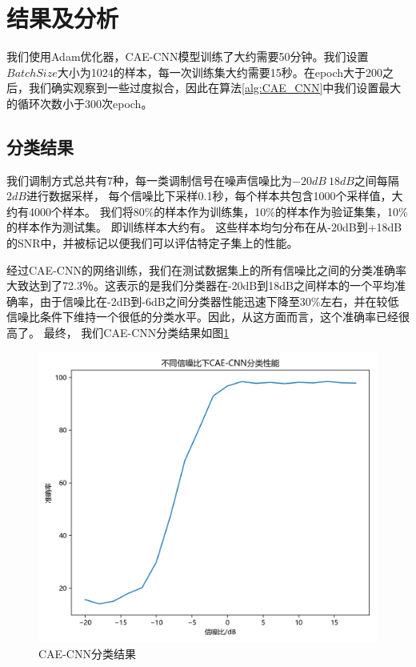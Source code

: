 \section{结果及分析}
我们使用Adam优化器，CAE-CNN模型训练了大约需要50分钟。我们设置$BatchSize$大小为1024的样本，每一次训练集大约需要15秒。在epoch大于200之后，我们确实观察到一些过度拟合，因此在算法\ref{alg:CAE_CNN}中我们设置最大的循环次数小于300次epoch。\par

\subsection{分类结果}
我们调制方式总共有7种，每一类调制信号在噪声信噪比为$-20dB~18dB$之间每隔$2dB$进行数据采样，
每个信噪比下采样0.1秒，每个样本共包含1000个采样值，大约有4000个样本。
我们将80\%的样本作为训练集，10\%的样本作为验证集集，10\%的样本作为测试集。
即训练样本大约有。 这些样本均匀分布在从-20dB到+18dB的SNR中，并被标记以便我们可以评估特定子集上的性能。\par

经过CAE-CNN的网络训练，我们在测试数据集上的所有信噪比之间的分类准确率大致达到了72.3％。这表示的是我们分类器在-20dB到18dB之间样本的一个平均准确率，由于信噪比在-2dB到-6dB之间分类器性能迅速下降至30\%左右，并在较低信噪比条件下维持一个很低的分类水平。因此，从这方面而言，这个准确率已经很高了。
最终， 我们CAE-CNN分类结果如图\ref{sec:fig_3_9}\par

\begin{figure}[!h]
	\centering
	\includegraphics[scale=0.7]{figures/chapter_3/fig_3_9}
	\caption{CAE-CNN分类结果}	\label{sec:fig_3_9}
\end{figure}

